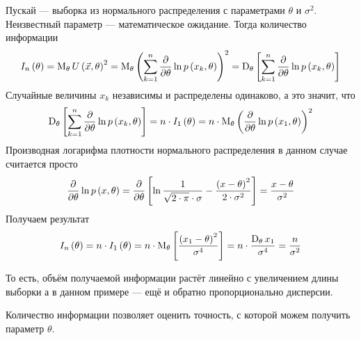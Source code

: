 \begin{example}
  Пускай \xsample --- выборка из нормального распределения с
  параметрами $\theta$ и $\sigma^2$.
  Неизвестный параметр --- математическое ожидание.
  Тогда количество информации
  \begin{equation*}
    I_n\left( \theta \right)
    = \operatorname{M}_{\theta} U\left( \vec{x}, \theta \right)^2
    = \operatorname{M}_{\theta} \left( \sum_{k=1}^{n} \frac{\partial}{\partial\theta}
      \ln{p\left(x_k, \theta\right)} \right)^2
    = \operatorname{D}_{\theta} \left[ \sum_{k=1}^{n} \frac{\partial}{\partial\theta}
      \ln{p\left(x_k, \theta\right)} \right]
  \end{equation*}
  Случайные величины $x_k$ независимы и распределены одинаково, а это значит,
  что
  \begin{equation*}
    \operatorname{D}_{\theta} \left[ \sum_{k=1}^{n} \frac{\partial}{\partial\theta}
      \ln{p\left(x_k, \theta\right)} \right]
    = n \cdot I_1\left( \theta \right)
    = n \cdot \operatorname{M}_{\theta} \left( \frac{\partial}{\partial \theta}
      \ln{p\left(x_1, \theta\right)} \right)^2
  \end{equation*}
  Производная логарифма плотности нормального распределения в данном случае
  считается просто
  \begin{equation*}
    \frac{\partial}{\partial \theta} \ln{p\left(x, \theta\right)}
    = \frac{\partial}{\partial \theta} \left[
        \ln{\frac{1}{\sqrt{2 \cdot \pi} \cdot \sigma}}
        - \frac{\left( x - \theta \right)^2}{2 \cdot \sigma^2} \right]
    = \frac{x - \theta}{\sigma^2}
  \end{equation*}
  Получаем результат
  \begin{equation*}
    I_n\left( \theta \right) = n \cdot I_1\left( \theta \right)
    = n \cdot \operatorname{M}_{\theta} \left[ \frac{\left( x_1 - \theta \right)^2}{\sigma^4} \right]
    = n \cdot \frac{\operatorname{D}_{\theta} x_1}{\sigma^4}
    = \frac{n}{\sigma^2}
  \end{equation*}

  То есть, объём получаемой информации растёт линейно с увеличением длины
  выборки а в данном примере --- ещё и обратно пропорционально дисперсии.
\end{example}

Количество информации позволяет оценить точность,
с которой можем получить параметр $\theta$.

